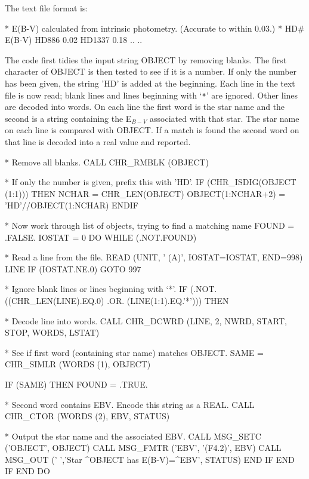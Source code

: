 \documentclass[twoside,11pt,nolof]{starlink}
\begin{document}
The text file  format is:
\begin{terminalv}
* E(B-V) calculated from intrinsic photometry. (Accurate to within 0.03.)
*  HD#     E(B-V)
   HD886   0.02
  HD1337   0.18
   ..        ..
\end{terminalv}
The code first tidies the input string OBJECT by removing blanks.
The first character of OBJECT is then tested to see if it is a number.
If only the number has been given, the string 'HD' is added at the beginning.
Each line in the text file is now read;
blank lines and lines beginning with `\texttt{*}' are ignored.
Other lines are decoded into words.
On each line the first word is the star name and the second is a
string containing the E$_{B-V}$ associated with that star.
The star name on each line is compared with OBJECT.
If a match is found the second word on that line is decoded into a real
value and reported.
\begin{terminalv}
*   Remove all blanks.
      CALL CHR_RMBLK (OBJECT)

*   If only the number is given, prefix this with 'HD'.
      IF (CHR_ISDIG(OBJECT (1:1))) THEN
         NCHAR = CHR_LEN(OBJECT)
         OBJECT(1:NCHAR+2) = 'HD'//OBJECT(1:NCHAR)
      ENDIF

*   Now work through list of objects, trying to find a matching name
      FOUND = .FALSE.
      IOSTAT = 0
      DO WHILE (.NOT.FOUND)

*      Read a line from the file.
         READ (UNIT, ' (A)', IOSTAT=IOSTAT, END=998) LINE
         IF (IOSTAT.NE.0) GOTO 997

*      Ignore blank lines or lines beginning with `*'.
         IF (.NOT.((CHR_LEN(LINE).EQ.0) .OR. (LINE(1:1).EQ.'*'))) THEN

*         Decode line into words.
            CALL CHR_DCWRD (LINE, 2, NWRD, START, STOP, WORDS, LSTAT)

*         See if first word (containing star name) matches OBJECT.
            SAME = CHR_SIMLR (WORDS (1), OBJECT)

            IF (SAME) THEN
               FOUND = .TRUE.

*            Second word contains EBV. Encode this string as a REAL.
               CALL CHR_CTOR (WORDS (2), EBV, STATUS)

*            Output the star name and the associated EBV.
               CALL MSG_SETC ('OBJECT', OBJECT)
               CALL MSG_FMTR ('EBV', '(F4.2)', EBV)
               CALL MSG_OUT (' ','Star ^OBJECT has E(B-V)=^EBV', STATUS)
            END IF
         END IF
      END DO
\end{terminalv}
\end{document}
